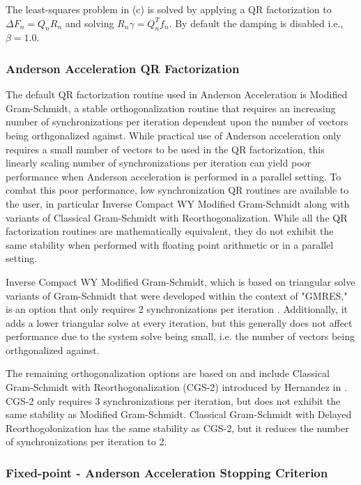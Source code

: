 The least-squares problem in (c) is solved by applying a QR factorization to
$\Delta F_n = Q_n R_n$ and solving $R_n \gamma = Q_n^T f_n$. By default the
damping is disabled i.e., $\beta = 1.0$.

\subsubsection*{Anderson Acceleration QR Factorization}
The default QR factorization routine used in Anderson Acceleration is 
Modified Gram-Schmidt, a stable orthogonalization routine that requires
an increasing number of synchronizations per iteration dependent upon
the number of vectors being orthgonalized against.
While practical use of Anderson acceleration only requires a small number
of vectors to be used in the QR factorization, this linearly scaling
number of synchronizations per iteration can yield poor performance
when Anderson acceleration is performed in a parallel setting.
To combat this poor performance, low synchronization QR routines are 
available to the user, in particular Inverse Compact WY Modified
Gram-Schmidt along with variants of Classical Gram-Schmidt with
Reorthogonalization.
While all the QR factorization routines are mathematically equivalent,
they do not exhibit the same stability when performed with floating
point arithmetic or in a parallel setting.

Inverse Compact WY Modified Gram-Schmidt,
which is based on triangular solve variants of Gram-Schmidt
that were developed within the context of "GMRES," is an option that only requires 2
synchronizations per iteration \cite{lowSyncGMRES}. Additionally, it
adds a lower triangular solve at every iteration, but this
generally does not affect performance due to the system solve
being small, i.e. the number of vectors being orthgonalized against.

The remaining orthogonalization options are based on and include
Classical Gram-Schmidt with Reorthogonalization (CGS-2) introduced
by Hernandez in \cite{hernandez2005parallel}.
CGS-2 only requires 3 synchronizations per iteration, but does not exhibit
the same stability as Modified Gram-Schmidt. Classical Gram-Schmidt with
Delayed Reorthogolonization has the same stability as CGS-2, but it reduces
the number of synchronizations per iteration to 2.


\subsubsection*{Fixed-point - Anderson Acceleration Stopping Criterion}

